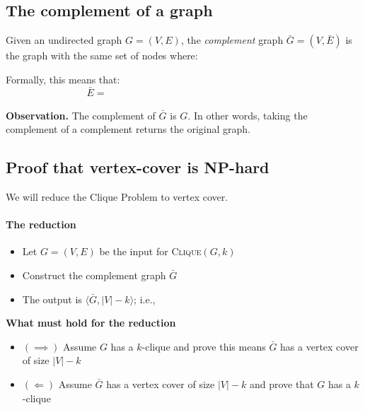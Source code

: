 \documentclass[11  pt]{article}
\begin{document}
\newpage
\subsection*{The complement of a graph}
Given an undirected graph $G = (V,E)$, the \emph{complement} graph $\bar{G} = (V,\bar{E})$ is the graph with the same set of nodes where:

\vs{1cm} 

Formally, this means that:
\begin{equation*}
	\bar{E} = \phantom{\{(i,j) \in V \times V \colon i\neq j \text{ and } (i,j) \notin E)\}}
\end{equation*}



\vfill
\textbf{Observation.} The complement of $\bar{G}$ is $G$. In other words, taking the complement of a complement returns the original graph.
\newpage

\subsection*{Proof that vertex-cover is NP-hard}


We will reduce the Clique Problem to vertex cover. 

\paragraph{The reduction}

\begin{itemize}
	\item Let $G = (V,E)$ be the input for \textsc{Clique}$(G,k)$
	
	\item Construct the complement graph $\bar{G}$
	
	
	\item The output is $\langle \bar{G}, |V|-k \rangle$; i.e., \\%
	
\end{itemize}

\vs{.5cm}

\textbf{What must hold for the reduction}
\begin{itemize}
	\item $(\implies)$ Assume $G$ has a $k$-clique and prove this means $\bar{G}$ has a vertex cover of size $|V| - k$
	\item $(\Longleftarrow)$ Assume $\bar{G}$ has a vertex cover of size $|V| - k$ and prove that $G$ has a $k$-clique
\end{itemize}
\end{document}
